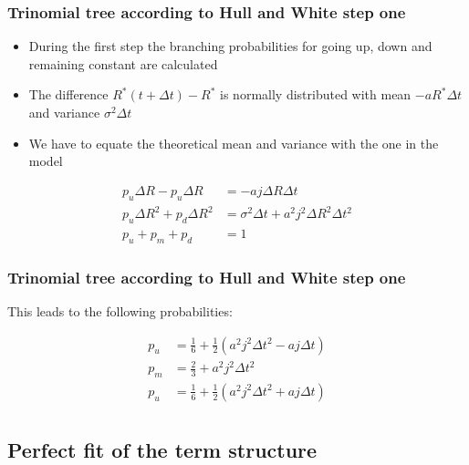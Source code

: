 \documentclass{beamer}
\begin{document}
	\begin{frame}
		\frametitle{Trinomial tree according to Hull and White step one} 
		\begin{itemize}
			\item During the first step the branching probabilities for going up, down and remaining constant are calculated
			\item The difference $R^*(t+\Delta t) - R^*$ is normally distributed with mean $-aR^* \Delta t$ and variance $\sigma ^2 \Delta t$ 
			\item We have to equate the theoretical mean and variance with the one in the model
		\end{itemize}
		
		\begin{align*}
		p_u \Delta R-p_u \Delta R &= -aj\Delta R\Delta t\\
		p_u\Delta R^2 + p_d \Delta R^2 &= \sigma ^2 \Delta t + a^2j^2 \Delta R^2 \Delta t^2\\
		p_u + p_m + p_d &= 1
		\end{align*}
		
		
	\end{frame}
	
	
	\begin{frame}
		\frametitle{Trinomial tree according to Hull and White step one} 
		
		This leads to the following probabilities:
		
		\begin{align*}
		p_u &= \frac{1}{6} + \frac{1}{2}(a^2j^2 \Delta t^2 - a j \Delta t)\\
		p_m &= \frac{2}{3} + a^2j^2 \Delta t^2 \\
		p_u &= \frac{1}{6} + \frac{1}{2}(a^2j^2 \Delta t^2 + a j \Delta t)\\
		\end{align*}
		
	\end{frame}
	
	
	
	\subsection{Perfect fit of the term structure}
	
\end{document}
